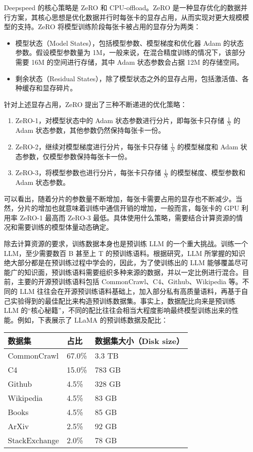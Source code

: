 \documentclass[
]{article}
\providecommand{\tightlist}{%
  \setlength{\itemsep}{0pt}\setlength{\parskip}{0pt}}
\begin{document}
Deepspeed 的核心策略是 ZeRO 和 CPU-offload。ZeRO
是一种显存优化的数据并行方案，其核心思想是优化数据并行时每张卡的显存占用，从而实现对更大规模模型的支持。ZeRO
将模型训练阶段每张卡被占用的显存分为两类：

\begin{itemize}
\tightlist
\item
  模型状态（Model States），包括模型参数、模型梯度和优化器 Adam
  的状态参数。假设模型参数量为
  1M，一般来说，在混合精度训练的情况下，该部分需要 16M
  的空间进行存储，其中 Adam 状态参数会占据 12M 的存储空间。
\item
  剩余状态（Residual
  States），除了模型状态之外的显存占用，包括激活值、各种缓存和显存碎片。
\end{itemize}

针对上述显存占用，ZeRO 提出了三种不断递进的优化策略：

\begin{enumerate}
\def\labelenumi{\arabic{enumi}.}
\tightlist
\item
  ZeRO-1，对模型状态中的 Adam 状态参数进行分片，即每张卡只存储
  \(\frac{1}{N}\) 的 Adam 状态参数，其他参数仍然保持每张卡一份。
\item
  ZeRO-2，继续对模型梯度进行分片，每张卡只存储 \(\frac{1}{N}\)
  的模型梯度和 Adam 状态参数，仅模型参数保持每张卡一份。
\item
  ZeRO-3，将模型参数也进行分片，每张卡只存储 \(\frac{1}{N}\)
  的模型梯度、模型参数和 Adam 状态参数。
\end{enumerate}

可以看出，随着分片的参数量不断增加，每张卡需要占用的显存也不断减少。当然，分片的增加也就意味着训练中通信开销的增加，一般而言，每张卡的
GPU 利用率 ZeRO-1 最高而 ZeRO-3
最低。具体使用什么策略，需要结合计算资源的情况和需要训练的模型体量动态确定。

除去计算资源的要求，训练数据本身也是预训练 LLM 的一个重大挑战。训练一个
LLM，至少需要数百 B 甚至上 T 的预训练语料。根据研究，LLM
所掌握的知识绝大部分都是在预训练过程中学会的，因此，为了使训练出的 LLM
能够覆盖尽可能广的知识面，预训练语料需要组织多种来源的数据，并以一定比例进行混合。目前，主要的开源预训练语料包括
CommonCrawl、C4、Github、Wikipedia 等。不同的 LLM
往往会在开源预训练语料基础上，加入部分私有高质量语料，再基于自己实验得到的最佳配比来构造预训练数据集。事实上，数据配比向来是预训练
LLM
的``核心秘籍''，不同的配比往往会相当大程度影响最终模型训练出来的性能。例如，下表展示了
LLaMA 的预训练数据及配比：

\begin{longtable}[]{@{}lll@{}}
\toprule\noalign{}
数据集 & 占比 & 数据集大小（Disk size） \\
\midrule\noalign{}
\endhead
\bottomrule\noalign{}
\endlastfoot
CommonCrawl & 67.0\% & 3.3 TB \\
C4 & 15.0\% & 783 GB \\
Github & 4.5\% & 328 GB \\
Wikipedia & 4.5\% & 83 GB \\
Books & 4.5\% & 85 GB \\
ArXiv & 2.5\% & 92 GB \\
StackExchange & 2.0\% & 78 GB \\
\end{longtable}
\end{document}
